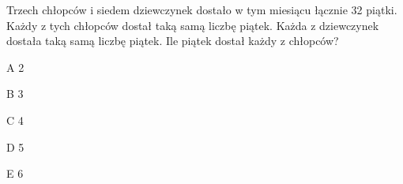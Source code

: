 \begin{tresc}
Trzech chłopców i siedem dziewczynek dostało w tym miesiącu łącznie 32 piątki. Każdy z tych chłopców dostał taką samą liczbę piątek. Każda z dziewczynek dostała taką samą liczbę piątek. Ile piątek dostał każdy z chłopców?
\end{tresc}
\begin{wariant}{A} 2 \end{wariant}
\begin{wariant}{B} 3 \end{wariant}
\begin{wariant}{C} 4 \end{wariant}
\begin{wariant}{D} 5 \end{wariant}
\begin{wariant}{E} 6 \end{wariant}
